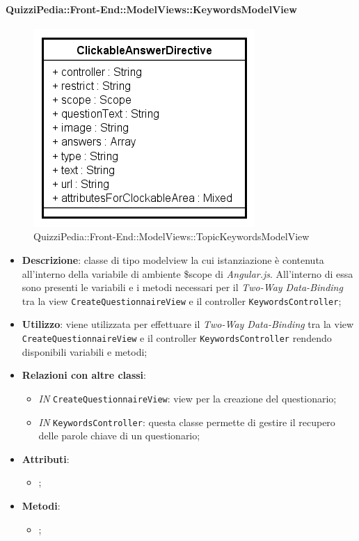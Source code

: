 \paragraph{QuizziPedia::Front-End::ModelViews::KeywordsModelView}
				
				\label{QuizziPedia::Front-End::ModelViews::TopicKeywordsModelView}
				
				\begin{figure}[ht]
					\centering
					\includegraphics[scale=0.5,keepaspectratio]{UML/Classi/Front-End/QuizziPedia_Front-end_Templates_ClickableAnswerTemplate.png}
					\caption{QuizziPedia::Front-End::ModelViews::TopicKeywordsModelView}
				\end{figure} \FloatBarrier
				
				\begin{itemize}
					\item \textbf{Descrizione}: classe di tipo modelview la cui istanziazione è contenuta all'interno della variabile di ambiente \$scope di \textit{Angular.js}. All'interno di essa sono presenti le variabili e i metodi necessari per il \textit{Two-Way Data-Binding} tra la view \texttt{CreateQuestionnaireView} e il controller \texttt{KeywordsController};
					\item \textbf{Utilizzo}: viene utilizzata per effettuare il \textit{Two-Way Data-Binding} tra la view \texttt{CreateQuestionnaireView} e il controller \texttt{KeywordsController} rendendo disponibili variabili e metodi;
					\item \textbf{Relazioni con altre classi}: 
					\begin{itemize}
						\item \textit{IN} \texttt{CreateQuestionnaireView}: view per la creazione del questionario; 
						\item \textit{IN} \texttt{KeywordsController}: questa classe permette di gestire il recupero delle parole chiave di un questionario;
					\end{itemize}
					\item \textbf{Attributi}: 
					\begin{itemize}
						\item ;
					\end{itemize}
					\item \textbf{Metodi}: 
					\begin{itemize}
						\item ;
					\end{itemize}
				\end{itemize}
				
					